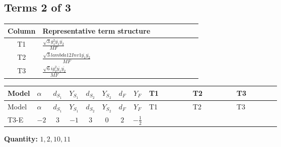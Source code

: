 \documentclass[8pt]{article}
\begin{document}
\begin{landscape}
\subsection*{Terms 2 of 3}
\begin{center}
\begin{tabular}{@{}c >{\raggedright\arraybackslash}p{0.82\linewidth}@{}}
\toprule
Column & Representative term structure \\
\midrule
T1 & \(\displaystyle \frac{\sqrt{3} g_{1}^{2} \overline{y_{1}} \overline{y_{2}}}{MF}\) \\
\midrule
T2 & \(\displaystyle \frac{\sqrt{3} lambda12Inv1 \overline{y_{1}} \overline{y_{2}}}{MF}\) \\
\midrule
T3 & \(\displaystyle \frac{\sqrt{6} i g_{2}^{2} \overline{y_{1}} \overline{y_{2}}}{MF}\) \\
\midrule
\bottomrule
\end{tabular}
\end{center}
\smallskip
\tiny
\begin{longtable}{@{}llcccccc >{\raggedright\arraybackslash}p{0.21\linewidth} >{\raggedright\arraybackslash}p{0.21\linewidth} >{\raggedright\arraybackslash}p{0.21\linewidth}@{}}
\toprule
Model & $\alpha$ & $d_{S_1}$ & $Y_{S_1}$ & $d_{S_2}$ & $Y_{S_2}$ & $d_F$ & $Y_F$ & T1 & T2 & T3 \\
\midrule
\endfirsthead
\toprule
Model & $\alpha$ & $d_{S_1}$ & $Y_{S_1}$ & $d_{S_2}$ & $Y_{S_2}$ & $d_F$ & $Y_F$ & T1 & T2 & T3 \\
\midrule
\endhead
T3-E & $-2$ & $3$ & $-1$ & $3$ & $0$ & $2$ & $-\frac{1}{2}$ & \scriptsize\adjustbox{max width=\linewidth}{$\begin{gathered} - \frac{\sqrt{3} g_{1}^{2} \overline{y_{1}} \overline{y_{2}}}{8 MF}\end{gathered}$} & \scriptsize\adjustbox{max width=\linewidth}{$\begin{gathered} \frac{\sqrt{3} lambda12Inv1 \overline{y_{1}} \overline{y_{2}}}{6 MF}\end{gathered}$} & \scriptsize\adjustbox{max width=\linewidth}{$\begin{gathered} \frac{\sqrt{6} i g_{2}^{2} \overline{y_{1}} \overline{y_{2}}}{6 MF}\end{gathered}$} \\
\midrule
\bottomrule
\end{longtable}
\clearpage
\noindent\textbf{Quantity: }$\mathrm{1,2,10,11}$\par\smallskip

\end{landscape}
\end{document}
